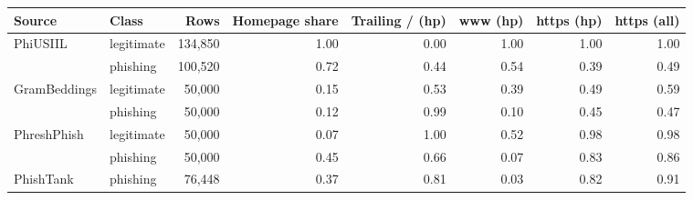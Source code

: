 {\footnotesize\setlength{\tabcolsep}{4pt}
\begin{tabular}{llrrrrrr}
\toprule
\textbf{Source} & \textbf{Class} & \textbf{Rows} & \textbf{Homepage share} & \textbf{Trailing / (hp)} & \textbf{www (hp)} & \textbf{https (hp)} & \textbf{https (all)} \\
\midrule
PhiUSIIL & legitimate & 134{,}850 & 1.00 & 0.00 & 1.00 & 1.00 & 1.00 \\
 & phishing & 100{,}520 & 0.72 & 0.44 & 0.54 & 0.39 & 0.49 \\
GramBeddings & legitimate & 50{,}000 & 0.15 & 0.53 & 0.39 & 0.49 & 0.59 \\
 & phishing & 50{,}000 & 0.12 & 0.99 & 0.10 & 0.45 & 0.47 \\
PhreshPhish & legitimate & 50{,}000 & 0.07 & 1.00 & 0.52 & 0.98 & 0.98 \\
 & phishing & 50{,}000 & 0.45 & 0.66 & 0.07 & 0.83 & 0.86 \\
PhishTank & phishing & 76{,}448 & 0.37 & 0.81 & 0.03 & 0.82 & 0.91 \\
\bottomrule
\end{tabular}
}

